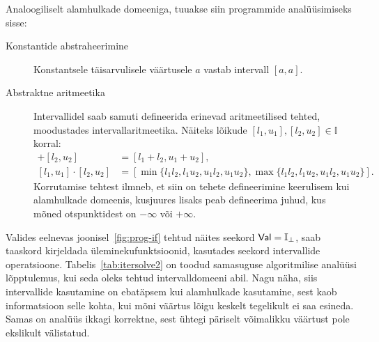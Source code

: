 \documentclass[../thesis.tex]{subfiles}
\begin{document}
Analoogiliselt alamhulkade domeeniga, tuuakse siin programmide analüüsimiseks sisse:
\begin{description}
	\item[Konstantide abstraheerimine] Konstantsele täisarvulisele väärtusele $a$ vastab intervall $[a, a]$.

	\item[Abstraktne aritmeetika] Intervallidel saab samuti defineerida erinevad aritmeetilised tehted, moodustades intervallaritmeetika. Näiteks lõikude $[l_1, u_1], [l_2, u_2] \in \mathbb{I}$ korral:
	\begin{align*}
		[l_1, u_1] + [l_2, u_2] &= [l_1 + l_2, u_1 + u_2], \\
		[l_1, u_1] \cdot [l_2, u_2] &= [\min\{l_1l_2, l_1u_2, u_1l_2, u_1u_2\}, \max\{l_1l_2, l_1u_2, u_1l_2, u_1u_2\}].
	\end{align*}
	Korrutamise tehtest ilmneb, et siin on tehete defineerimine keerulisem kui alamhulkade domeenis, kusjuures lisaks peab defineerima juhud, kus mõned otspunktidest on $-\infty$ või $+\infty$.
\end{description}

Valides eelnevas joonisel~\ref{fig:prog-if} tehtud näites seekord $\mathsf{Val} = \mathbb{I}_\bot$, saab taaskord kirjeldada üleminekufunktsioonid, kasutades seekord intervallide operatsioone. Tabelis~\ref{tab:itersolve2} on toodud samasuguse algoritmilise analüüsi lõpptulemus, kui seda oleks tehtud intervalldomeeni abil. Nagu näha, siis intervallide kasutamine on ebatäpsem kui alamhulkade kasutamine, sest kaob informatsioon selle kohta, kui mõni väärtus lõigu keskelt tegelikult ei saa esineda. Samas on analüüs ikkagi korrektne, sest ühtegi päriselt võimalikku väärtust pole ekslikult välistatud.
\end{document}
